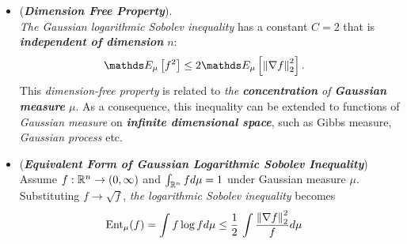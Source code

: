 \documentclass[11pt]{article}
\begin{document}
\begin{itemize}
\item \begin{remark} (\textbf{\emph{Dimension Free Property}}).\\
\emph{The Gaussian logarithmic Sobolev inequality} has a constant $C = 2$ that is \emph{\textbf{independent of dimension}} $n$:
\begin{align*}
\E{\mu}{f^2} &\le 2\E{\mu}{\norm{\nabla f}{2}^2}.
\end{align*} This \emph{dimension-free property} is related to \emph{the \textbf{concentration} of \textbf{Gaussian measure} $\mu$}. As a consequence, this inequality can be extended to functions of \emph{Gaussian measure} on \emph{\textbf{infinite dimensional space}}, such as Gibbs measure, \emph{Gaussian process} etc.
\end{remark}

\item \begin{remark}(\textbf{\emph{Equivalent Form of Gaussian Logarithmic Sobolev Inequality}})\\
Assume $f: {\mathbb R}^n \to (0, \infty)$ and $\int_{{\mathbb R}^n} f d\mu = 1$ under Gaussian measure $\mu$. Substituting $f \to \sqrt{f}$,  \emph{the logarithmic Sobolev inequality} becomes
\begin{align}
\text{Ent}_{\mu}(f) = \int f\log f d\mu &\le \frac{1}{2}\, \int \frac{\left\|\nabla f\right\|_{2}^2}{f} d\mu \label{ineqn: log_sobolev_inequality_gaussian_v2} 
\end{align} 
\end{remark}


\end{itemize}
\end{document}

